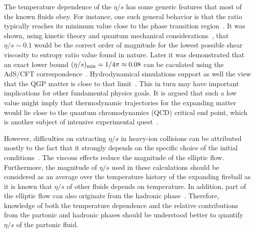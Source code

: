\documentclass[ALICE,manyauthors]{cernphprep}
\begin{document}
The temperature dependence of the $\eta/s$ has some generic features that most of the known fluids obey. For instance, one such general behavior is that the ratio typically reaches its minimum value close to the phase transition region~\cite{Lacey:2006bc}. 
It was shown, using kinetic theory and quantum mechanical considerations~\cite{PhysRevD.31.53}, that $\eta/s\sim0.1$ would be the correct order of magnitude for the lowest possible shear viscosity to entropy ratio value found in nature. Later it was demonstrated that an exact lower bound $(\eta/s)_{\rm min}=1/4\pi\approx0.08$ can be caculated using the AdS/CFT correspondence~\cite{Kovtun:2004de}. Hydrodynamical simulations support as well the view that the QGP matter is close to that limit~\cite{Gale:2012rq}. This in turn may have important implications for other fundamental physics goals. It is argued that such a low value might imply that thermodynamic trajectories for the expanding matter would lie close to the quantum chromodynamics (QCD) critical end point, which is another subject of intensive experimental quest~\cite{Lacey:2006bc}.

However, difficulties on extracting $\eta/s$ in heavy-ion collisions can be attributed mostly to the fact that it strongly depends on the specific choice of the initial conditions~\cite{Romatschke:2007mq,Luzum:2012wu,Shen:2011zc}.
The viscous effects reduce the magnitude of the elliptic flow. Furthermore, the magnitude of $\eta/s$ used in these calculations should be considered as an average over the temperature history of the expanding fireball as it is known that $\eta/s$ of other fluids depends on temperature. 
In addition, part of the elliptic flow can also originate from the hadronic phase~\cite{Bozek:2011ua,Rose:2014fba,Ryu:2015vwa}. Therefore,
knowledge of both the temperature dependence and the relative contributions from the partonic and hadronic phases should be understood better to quantify $\eta/s$ of the partonic fluid.
\end{document}
